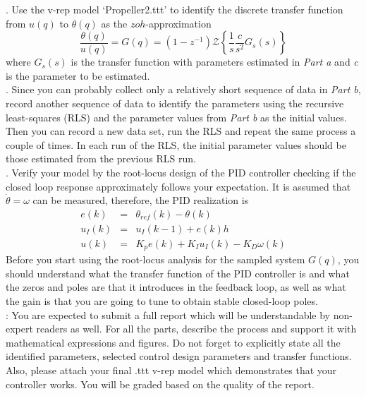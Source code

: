 \documentclass{article}
\begin{document}
. Use the v-rep model `Propeller2.ttt' to identify 
the discrete transfer function from 
$u(q)$ to $\theta(q)$ as the $zoh$-approximation \\
\begin{equation}
 \frac{\theta(q)}{u(q)}=G(q)= (1-z^{-1})\mathcal{Z}\left\{\frac{1}{s}\frac{c}{s^2}G_s(s)\right\}
\end{equation}
where $G_s(s)$ is the transfer function with parameters estimated in 
{\it Part a} and {\it c} is the parameter to be estimated.\\

. Since you can probably collect only a relatively 
short sequence of data in {\it Part b}, record another sequence of 
data to identify the parameters using the recursive least-squares (RLS)
and the parameter values from {\it Part b} as the initial values. Then you 
can record a new data set, run the RLS and repeat the same process a couple of times. In each run of the RLS, the initial parameter values should be those estimated from the previous RLS run. \\

. Verify your model by the root-locus design of the 
PID controller checking if the closed loop response approximately 
follows your expectation. It is assumed that $\dot{\theta}=\omega$ can be 
measured, therefore, the PID realization is 
\begin{eqnarray}
e(k)&=&\theta_{ref}(k)-\theta(k) \\ 
u_I(k)&=&u_I(k-1) +e(k) h \\
u(k)&=&K_pe(k)+K_Iu_I(k)-K_D \omega(k) 
\end{eqnarray}
Before you start using the root-locus analysis for the sampled system
$G(q)$, you should understand what the transfer function of the PID controller is and what the zeros and poles are that it introduces in the feedback loop, as well as what the gain is that you are going 
to tune to obtain stable closed-loop poles.\\

: You are expected to submit a full report which will be understandable by non-expert readers as well. For all the parts, describe the process and support it with mathematical expressions and figures. Do not forget to explicitly state all the identified parameters, selected control design parameters and transfer functions. Also, please attach your final .ttt v-rep model which demonstrates that your controller works. You will be graded based on the quality of the report.



 
\end{document}
